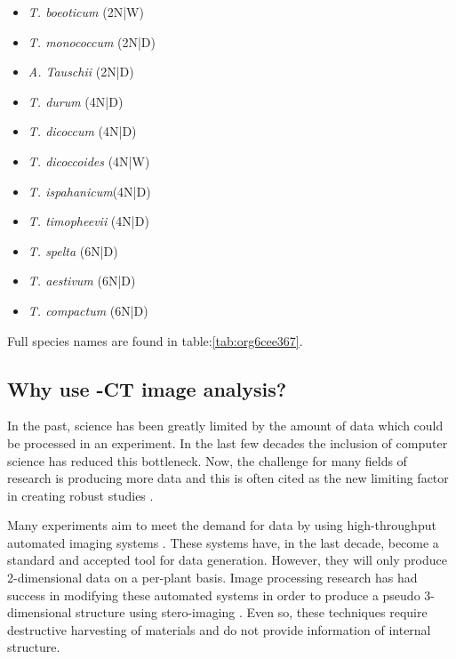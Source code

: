 \documentclass[11pt]{report}
\begin{document}
\begin{multicols}{3}

  \begin{itemize}
  \item{\textit{T. boeoticum} (2N|W)}
  \item{\textit{T. monococcum} (2N|D)}
  \item{\textit{A. Tauschii} (2N|D)}
  \end{itemize}

  \columnbreak

  \begin{itemize}
  \item{\textit{T. durum} (4N|D)}
  \item{\textit{T. dicoccum} (4N|D)}
  \item{\textit{T. dicoccoides} (4N|W)}
  \item{\textit{T. ispahanicum}(4N|D)}
  \item{\textit{T. timopheevii} (4N|D)}
  \end{itemize}

  \columnbreak

  \begin{itemize}
  \item{\textit{T. spelta} (6N|D)}
  \item{\textit{T. aestivum} (6N|D)}
  \item{\textit{T. compactum} (6N|D)}
  \end{itemize}

\end{multicols}
Full species names are found in table:\ref{tab:org6cee367}.

\subsection{Why use \textmu{}-CT image analysis?}
\label{sec:orga7b0a6f}
In the past, science has been greatly limited by the amount of data which could be processed in an experiment. In the last few decades the inclusion of computer science has reduced this bottleneck. Now, the challenge for many fields of research is producing more data and this is often cited as the new limiting factor in creating robust studies \cite{Furbank2011}.

Many experiments aim to meet the demand for data by using high-throughput automated imaging systems \cite{Naumann2007,Prasanna2013,Humplik2015}. These systems have, in the last decade, become a standard and accepted tool for data generation. However, they will only produce 2-dimensional data on a per-plant basis. Image processing research has had success in modifying these automated systems in order to produce a pseudo 3-dimensional structure using stero-imaging \cite{Roussel2016}. Even so, these techniques require destructive harvesting of materials and do not provide information of internal structure.
\end{document}
